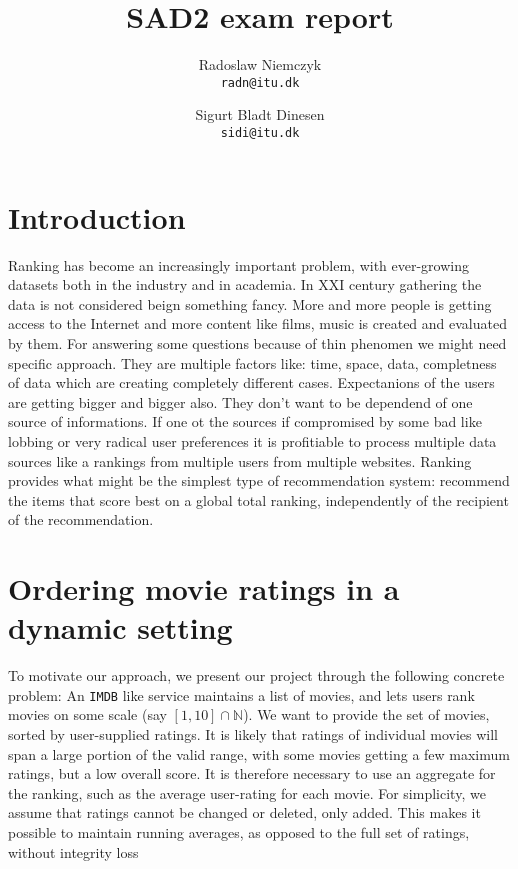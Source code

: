 \documentclass[a4paper, titlepage]{report}
\renewcommand{\%}{\scalebox{.9}{\oldpct}}
\begin{document}
\title{SAD2 exam report}
\author{
	Radoslaw Niemczyk
	\\\texttt{radn@itu.dk}
	\and
	Sigurt Bladt Dinesen
	\\\texttt{sidi@itu.dk}
}

\maketitle

\section*{Introduction}
Ranking has become an increasingly important problem, with ever-growing datasets
both in the industry and in academia. In XXI century gathering the data is not
considered beign something fancy. More and more people is getting access to the
Internet and more content like films, music is created and evaluated by them.
For answering some questions because of thin phenomen
we might need specific approach. They are multiple factors
like: time, space, data, completness of data which are creating completely different
cases.
Expectanions of the users are getting bigger and bigger also. They don't want to
be dependend of one source of informations. If one ot the sources if compromised
by some bad like lobbing or very radical user preferences it is profitiable to
process multiple data sources like a rankings from multiple users from multiple
websites.
Ranking provides what might be the simplest type of recommendation system:
recommend the items that score best on a global total ranking, independently of
the recipient of the recommendation.

\section*{Ordering movie ratings in a dynamic setting}
To motivate our approach, we present our project through the following concrete
problem: An \texttt{IMDB} like service maintains a list of movies, and lets
users rank movies on some scale (say $\left[1,10\right]\cap \mathbb{N}$). We
want to provide the set of movies, sorted by user-supplied ratings. It is likely
that ratings of individual movies will span a large portion of the valid range, with
some movies getting a few maximum ratings, but a low overall score. It is
therefore necessary to use an aggregate for the ranking, such as the average
user-rating for each movie. For simplicity, we assume that ratings cannot be
changed or deleted, only added. This makes it possible to maintain running
averages, as
opposed to the full set of ratings, without integrity loss
\end{document}
